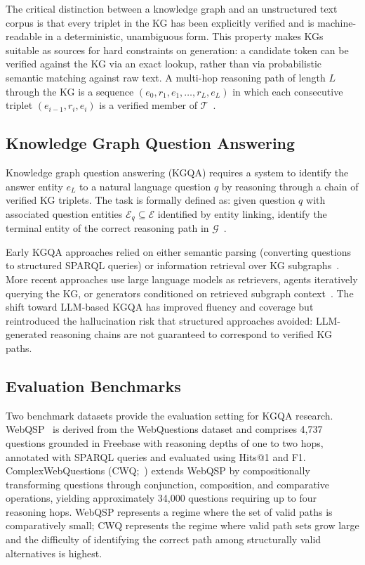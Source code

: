 The critical distinction between a knowledge graph and an unstructured text corpus is that every triplet in the KG has been explicitly verified and is machine-readable in a deterministic, unambiguous form. This property makes KGs suitable as sources for hard constraints on generation: a candidate token can be verified against the KG via an exact lookup, rather than via probabilistic semantic matching against raw text. A multi-hop reasoning path of length $L$ through the KG is a sequence $(e_0, r_1, e_1, \ldots, r_L, e_L)$ in which each consecutive triplet $(e_{i-1}, r_i, e_i)$ is a verified member of $\mathcal{T}$~\citep{lan2022kgqa}.

\subsection{Knowledge Graph Question Answering}

Knowledge graph question answering (KGQA) requires a system to identify the answer entity $e_L$ to a natural language question $q$ by reasoning through a chain of verified KG triplets. The task is formally defined as: given question $q$ with associated question entities $\mathcal{E}_q \subseteq \mathcal{E}$ identified by entity linking, identify the terminal entity of the correct reasoning path in $\mathcal{G}$~\citep{lan2022kgqa}.



Early KGQA approaches relied on either semantic parsing (converting questions to structured SPARQL queries) or information retrieval over KG subgraphs~\citep{lan2022kgqa}. More recent approaches use large language models as retrievers, agents iteratively querying the KG, or generators conditioned on retrieved subgraph context~\citep{jiang2023structgpt, jin2024graphcot, luo2024rog}. The shift toward LLM-based KGQA has improved fluency and coverage but reintroduced the hallucination risk that structured approaches avoided: LLM-generated reasoning chains are not guaranteed to correspond to verified KG paths.

\subsection{Evaluation Benchmarks}

Two benchmark datasets provide the evaluation setting for KGQA research. WebQSP~\citep{yih2016websqp} is derived from the WebQuestions dataset and comprises 4,737 questions grounded in Freebase with reasoning depths of one to two hops, annotated with SPARQL queries and evaluated using Hits@1 and F1. ComplexWebQuestions (CWQ;~\citealt{talmor2018cwq}) extends WebQSP by compositionally transforming questions through conjunction, composition, and comparative operations, yielding approximately 34,000 questions requiring up to four reasoning hops. WebQSP represents a regime where the set of valid paths is comparatively small; CWQ represents the regime where valid path sets grow large and the difficulty of identifying the correct path among structurally valid alternatives is highest.

